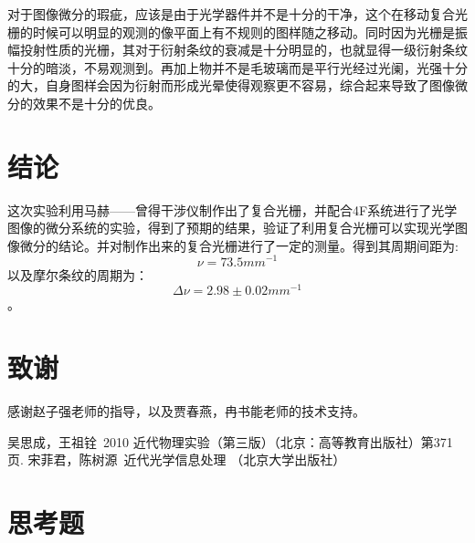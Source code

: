 \documentclass[aps,pre,12pt,preprint,onecolumn,showpacs,showkeys,UTF8]{revtex4-1}
\begin{document}
对于图像微分的瑕疵，应该是由于光学器件并不是十分的干净，这个在移动复合光栅的时候可以明显的观测的像平面上有不规则的图样随之移动。同时因为光栅是振幅投射性质的光栅，其对于衍射条纹的衰减是十分明显的，也就显得一级衍射条纹十分的暗淡，不易观测到。再加上物并不是毛玻璃而是平行光经过光阑，光强十分的大，自身图样会因为衍射而形成光晕使得观察更不容易，综合起来导致了图像微分的效果不是十分的优良。

\section{结论}

这次实验利用马赫——曾得干涉仪制作出了复合光栅，并配合4F系统进行了光学图像的微分系统的实验，得到了预期的结果，验证了利用复合光栅可以实现光学图像微分的结论。并对制作出来的复合光栅进行了一定的测量。得到其周期间距为:
$$\nu=73.5mm^{-1}$$
以及摩尔条纹的周期为：
$$\Delta\nu=2.98 \pm 0.02 mm^{-1}$$。

 
\section{致谢}
感谢赵子强老师的指导，以及贾春燕，冉书能老师的技术支持。



\begin{thebibliography}{}
	 吴思成，王祖铨~2010 近代物理实验（第三版）（北京：高等教育出版社）第371页.
	 宋菲君，陈树源~近代光学信息处理 （北京大学出版社） 
%
%
\end{thebibliography}

\clearpage
\appendix
\section{思考题}
\end{document}
